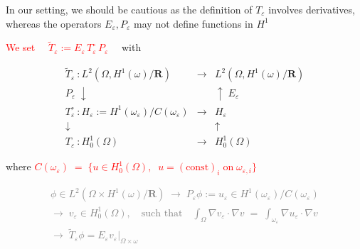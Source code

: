 \documentclass[mathserif,9pt]{beamer}
\def\e{{\varepsilon}}
\def\ds{\displaystyle}
\def\R{\mathbf R}
\begin{document}
\begin{frame}
\small{
In our setting, we should be cautious as the definition of $T_\e$ 
involves derivatives, whereas the operators $E_\e, P_\e$ may not
define functions in $H^1$
\bigskip

\textcolor{red}{We set $\quad \tilde{T}_\e := E_\e \, T^\circ_\e \, P_\e \quad$} with
\medskip

\begin{eqnarray*}
\tilde{T}_\e~: L^2(\Omega, H^1(\omega)/\R) &\longrightarrow & L^2(\Omega, H^1(\omega)/\R)
\\
P_\e \;\downarrow && \uparrow \; E_\e
\\
{T^\circ_\e}~: H_\e := H^1(\omega_\e)/C(\omega_\e) &\longrightarrow& H_\e 
\\
\downarrow && \uparrow 
\\
T_\e~: H^1_0(\Omega) &\longrightarrow& H^1_0(\Omega)
\end{eqnarray*}
\bigskip

where \textcolor{red}{$C(\omega_\e) \;=\; 
\{ u \in H^1_0(\Omega),  \;\; u = (\textrm{const})_i \;\textrm{on}\; \omega_{\e,i} \}$}
\medskip


\textcolor{gray}{
\[ \begin{array}{l}
\phi \in L^2(\Omega \times H^1(\omega)/\R)
\;\rightarrow\;
P_\e \phi := u_\e \in H^1(\omega_\e)/C(\omega_\e)
\\
\rightarrow \; v_\e \in H^1_0(\Omega), \quad \textrm{such that} \quad
\ds\int_\Omega \nabla v_\e \cdot \nabla v \;=\; \ds\int_{\omega_\e} \nabla u_\e \cdot \nabla v
\\
\rightarrow\; \tilde{T}_\e \phi = E_\e v_\e|_{\Omega \times \omega}
\end{array}
\]}


}
\end{frame}
\end{document}
